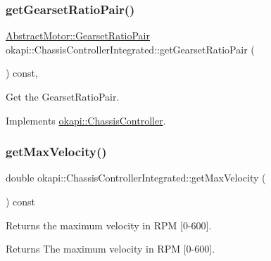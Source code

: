 \subsubsection{\texorpdfstring{getGearsetRatioPair()}{getGearsetRatioPair()}}
{\footnotesize\ttfamily \mbox{\hyperlink{structokapi_1_1AbstractMotor_1_1GearsetRatioPair}{Abstract\+Motor\+::\+Gearset\+Ratio\+Pair}} okapi\+::\+Chassis\+Controller\+Integrated\+::get\+Gearset\+Ratio\+Pair (\begin{DoxyParamCaption}{ }\end{DoxyParamCaption}) const\hspace{0.3cm}{\ttfamily [override]}, {\ttfamily [virtual]}}

Get the Gearset\+Ratio\+Pair. 

Implements \mbox{\hyperlink{classokapi_1_1ChassisController_aa19351888b997d4a6596dac24520ebff}{okapi\+::\+Chassis\+Controller}}.

\mbox{\label{classokapi_1_1ChassisControllerIntegrated_a0009684f33e2a008621fd601785f85fb}} 
\subsubsection{\texorpdfstring{getMaxVelocity()}{getMaxVelocity()}}
{\footnotesize\ttfamily double okapi\+::\+Chassis\+Controller\+Integrated\+::get\+Max\+Velocity (\begin{DoxyParamCaption}{ }\end{DoxyParamCaption}) const\hspace{0.3cm}{\ttfamily [virtual]}}

Returns the maximum velocity in R\+PM \mbox{[}0-\/600\mbox{]}.

\begin{DoxyReturn}{Returns}
The maximum velocity in R\+PM \mbox{[}0-\/600\mbox{]}. 
\end{DoxyReturn}
\mbox{\label{classokapi_1_1ChassisControllerIntegrated_a60c9a11616a2a41400c17952c36a5b57}} 
